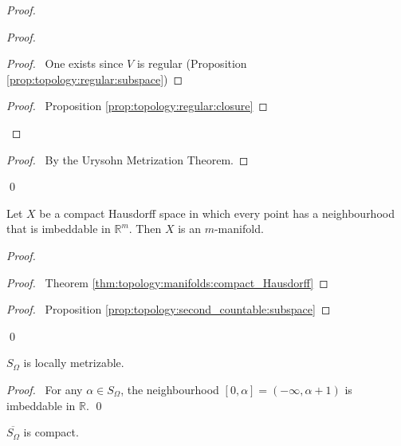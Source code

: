 \begin{proof}
\pf
{}
\begin{proof}
  \begin{proof}
    \pf\ One exists since $V$ is regular (Proposition
    \ref{prop:topology:regular:subspace})
  \end{proof}
  \qedstep
  \begin{proof}
    \pf\ Proposition \ref{prop:topology:regular:closure}
  \end{proof}
\end{proof}
\qedstep
\begin{proof}
  \pf\ By the Urysohn Metrization Theorem.
\end{proof}
\qed
\end{proof}

\begin{thm}
Let $X$ be a compact Hausdorff space in which every point has a neighbourhood
that is imbeddable in $\mathbb{R}^m$. Then $X$ is an $m$-manifold.
\end{thm}

\begin{proof}
\pf
{}
\begin{proof}
  \pf\ Theorem \ref{thm:topology:manifolds:compact_Hausdorff}
\end{proof}
\begin{proof}
  \pf\ Proposition \ref{prop:topology:second_countable:subspace}
\end{proof}
\qed
\end{proof}

\begin{prop}
$S_\Omega$ is locally metrizable.
\end{prop}

\begin{proof}
\pf\ For any $\alpha \in S_\Omega$, the neighbourhood $[0, \alpha] = (-
\infty, \alpha + 1)$ is imbeddable in $\mathbb{R}$. \qed
\end{proof}

\begin{prop}[DC]
 $\overline{S_\Omega}$ is compact.
\end{prop}

